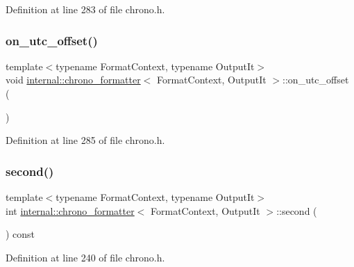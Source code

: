 Definition at line 283 of file chrono.\+h.

\mbox{\label{structinternal_1_1chrono__formatter_a3f36832d4407ff9d035d57ab5904bd83}} 
\subsubsection{\texorpdfstring{on\+\_\+utc\+\_\+offset()}{on\_utc\_offset()}}
{\footnotesize\ttfamily template$<$typename Format\+Context, typename Output\+It$>$ \\
void \hyperlink{structinternal_1_1chrono__formatter}{internal\+::chrono\+\_\+formatter}$<$ Format\+Context, Output\+It $>$\+::on\+\_\+utc\+\_\+offset (\begin{DoxyParamCaption}{ }\end{DoxyParamCaption})\hspace{0.3cm}{\ttfamily [inline]}}



Definition at line 285 of file chrono.\+h.

\mbox{\label{structinternal_1_1chrono__formatter_ab026333785c1f7bb169ba5d59ca90e34}} 
\subsubsection{\texorpdfstring{second()}{second()}}
{\footnotesize\ttfamily template$<$typename Format\+Context, typename Output\+It$>$ \\
int \hyperlink{structinternal_1_1chrono__formatter}{internal\+::chrono\+\_\+formatter}$<$ Format\+Context, Output\+It $>$\+::second (\begin{DoxyParamCaption}{ }\end{DoxyParamCaption}) const\hspace{0.3cm}{\ttfamily [inline]}}



Definition at line 240 of file chrono.\+h.

